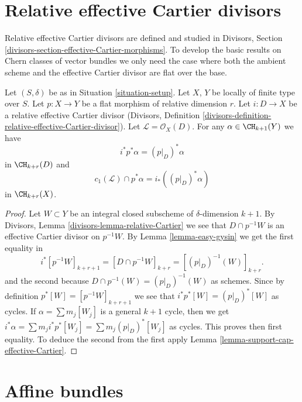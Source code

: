 \section{Relative effective Cartier divisors}
\label{section-relative-effective-cartier}

\noindent
Relative effective Cartier divisors are defined and studied
in Divisors, Section \ref{divisors-section-effective-Cartier-morphisms}.
To develop the basic results on Chern classes of vector bundles
we only need the case where both the ambient scheme and the effective
Cartier divisor are flat over the base.

\begin{lemma}
\label{lemma-relative-effective-cartier}
Let $(S, \delta)$ be as in Situation \ref{situation-setup}.
Let $X$, $Y$ be locally of finite type over $S$.
Let $p : X \to Y$ be a flat morphism of relative dimension $r$.
Let $i : D \to X$ be a relative effective Cartier divisor
(Divisors, Definition
\ref{divisors-definition-relative-effective-Cartier-divisor}).
Let $\mathcal{L} = \mathcal{O}_X(D)$.
For any $\alpha \in \CH_{k + 1}(Y)$ we have
$$
i^*p^*\alpha = (p|_D)^*\alpha
$$
in $\CH_{k + r}(D)$ and
$$
c_1(\mathcal{L}) \cap p^*\alpha = i_* ((p|_D)^*\alpha)
$$
in $\CH_{k + r}(X)$.
\end{lemma}

\begin{proof}
Let $W \subset Y$ be an integral closed subscheme of $\delta$-dimension
$k + 1$. By Divisors, Lemma \ref{divisors-lemma-relative-Cartier}
we see that $D \cap p^{-1}W$ is an effective
Cartier divisor on $p^{-1}W$. By Lemma \ref{lemma-easy-gysin}
we get the first equality in
$$
i^*[p^{-1}W]_{k + r + 1} =
[D \cap p^{-1}W]_{k + r} =
[(p|_D)^{-1}(W)]_{k + r}.
$$
and the second because $D \cap p^{-1}(W) = (p|_D)^{-1}(W)$ as schemes.
Since by definition $p^*[W] = [p^{-1}W]_{k + r + 1}$ we see that
$i^*p^*[W] = (p|_D)^*[W]$ as cycles. If $\alpha = \sum m_j[W_j]$ is a
general $k + 1$ cycle, then we get
$i^*\alpha = \sum m_j i^*p^*[W_j] = \sum m_j(p|_D)^*[W_j]$ as cycles.
This proves then first equality. To deduce the second from the
first apply Lemma \ref{lemma-support-cap-effective-Cartier}.
\end{proof}








\section{Affine bundles}
\label{section-affine-vector}

